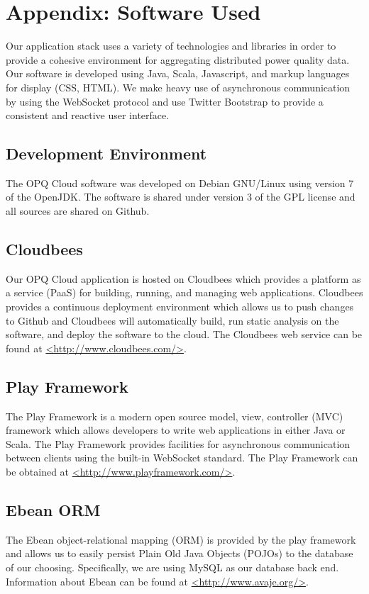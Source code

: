 
\section{Appendix: Software Used}
\label{software_used}
Our application stack uses a variety of technologies and libraries in order to provide a cohesive environment for aggregating distributed power quality data. Our software is developed using Java, Scala, Javascript, and markup languages for display (CSS, HTML). We make heavy use of asynchronous communication by using the WebSocket protocol and use Twitter Bootstrap to provide a consistent and reactive user interface.

\subsection{Development Environment}
The OPQ Cloud software was developed on Debian GNU/Linux using version 7 of the OpenJDK. The software is shared under version 3 of the GPL license and all sources are shared on Github.

\subsection{Cloudbees}
Our OPQ Cloud application is hosted on Cloudbees which provides a platform as a service (PaaS) for building, running, and managing web applications. Cloudbees provides a continuous deployment environment which allows us to push changes to Github and Cloudbees will automatically build, run static analysis on the software, and deploy the software to the cloud. The Cloudbees web service can be found at \url{<http://www.cloudbees.com/>}.

\subsection{Play Framework}
The Play Framework is a modern open source model, view, controller (MVC) framework which allows developers to write web applications in either Java or Scala. The Play Framework provides facilities for asynchronous communication between clients using the built-in WebSocket standard. The Play Framework can be obtained at \url{<http://www.playframework.com/>}.

\subsection{Ebean ORM}
The Ebean object-relational mapping (ORM) is provided by the play framework and allows us to easily persist Plain Old Java Objects (POJOs) to the database of our choosing. Specifically, we are using MySQL as our database back end. Information about Ebean can be found at \url{<http://www.avaje.org/>}.

